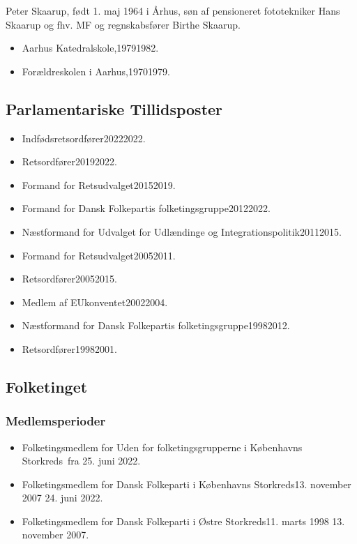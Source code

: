 \documentclass[11pt, a4paper]{awesome-cv}
\begin{document}
\makecvheader[R]
\makelettertitle
\begin{cvletter}
Peter Skaarup, født 1. maj 1964 i Århus, søn af pensioneret fototekniker Hans Skaarup og fhv. MF og regnskabsfører Birthe Skaarup.

\begin{itemize}
\item Aarhus Katedralskole,19791982.
\item Forældreskolen i Aarhus,19701979.
\end{itemize}
\subsection*{Parlamentariske Tillidsposter}
\begin{itemize}
\item Indfødsretsordfører20222022.
\item Retsordfører20192022.
\item Formand for Retsudvalget20152019.
\item Formand for Dansk Folkepartis folketingsgruppe20122022.
\item Næstformand for Udvalget for Udlændinge og Integrationspolitik20112015.
\item Formand for Retsudvalget20052011.
\item Retsordfører20052015.
\item Medlem af EUkonventet20022004.
\item Næstformand for Dansk Folkepartis folketingsgruppe19982012.
\item Retsordfører19982001.
\end{itemize}
\subsection*{Folketinget}
\subsubsection*{Medlemsperioder}
\begin{itemize}
\item Folketingsmedlem for Uden for folketingsgrupperne i Københavns Storkreds fra 25. juni 2022.
\item Folketingsmedlem for Dansk Folkeparti i Københavns Storkreds13. november 2007  24. juni 2022.
\item Folketingsmedlem for Dansk Folkeparti i Østre Storkreds11. marts 1998  13. november 2007.
\end{itemize}

\end{cvletter}
\end{document}
